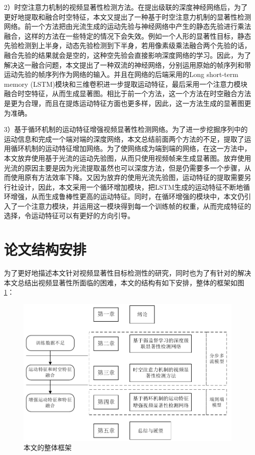 2）时空注意力机制的视频显著性检测方法。在提出级联的深度神经网络后，为了更好地提取和融合时空特征，本文又提出了一种基于时空注意力机制的显著性检测网络。前一个方法把由光流生成的运动先验与神经网络中产生的静态先验进行乘法融合，这样的方法在一些特定的情况下会失效。例如一个人形的显著性目标，静态先验检测到上半身，动态先验检测到下半身，若用像素级乘法融合两个先验的话，融合先验的结果就会是空的，这种空先验会直接影响深度网络的学习。因此，为了解决这一融合问题，本文提出了一种双流的神经网络，分别运用原始的帧序列和带运动先验的帧序列作为网络的输入。并且在网络的后端采用的Long short-term memory (LSTM)模块和三维卷积进一步提取运动特征，最后采用一个注意力模块融合时空特征，从而生成显著图。相比于前一个方法，这一个方法在时空融合方法是更为合理，而且在提炼运动特征方面也更多样，因此，这一方法生成的显著图更为准确。

3）基于循环机制的运动特征增强视频显著性检测网络。为了进一步挖掘序列中的运动信息和完成一个端对端的深度网络，本文总结前面两个方法的不足，提取了运用循环机制的运动特征增加网络。为了使网络成为端到端的网络，在这一方法中，本文放弃使用基于光流的运动先验图，从而只使用视频帧来生成显著图。放弃使用光流的原因主要是因为光流提取虽然也可以深度方法，但是仍需要多一个步骤，从而使用原有方法效率下降。又因为放弃的使用光流先验图，运动特征的提取需要另行社设计，因此，本文采用一个循环增加模块，把LSTM生成的运动特征不断地循环增强，从而生成鲁棒性更高的运动特征。同时，在循环增强的模块中，本文仍引入了一个注意力模块，并运用这一模块得到每一个训练帧的权重，从而完成特征的选择，令运动特征可以有更好的方向引导。

\section{论文结构安排}
为了更好地描述本文针对视频显著性目标检测性的研究，同时也为了有针对的解决本文总结出视频显著性所面临的困难，本文的结构有如下安排，整体的框架如图\ref{figure1}：

\begin{figure}
\includegraphics[width=15cm]{figures/outline}
\caption{本文的整体框架}
\label{figure1}
\end{figure}

